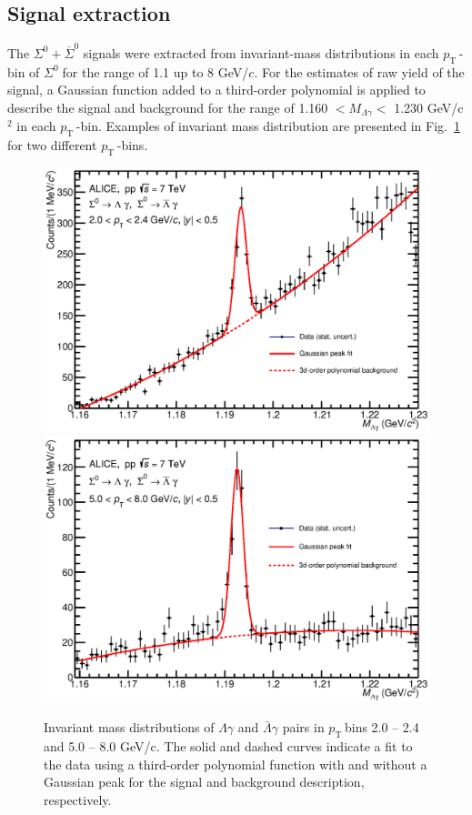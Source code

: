 \documentclass[ALICE,manyauthors]{cernphprep}
\newcommand{\sig}{\ensuremath{\Sigma^0  \; }}
\newcommand{\pt}{\ensuremath{p_{\mathrm{T}\; }}}
\begin{document}
 \subsection{Signal extraction} 
 \label{subsec:signal}

The $\Sigma^{0} + \overline{\Sigma}^{0}$ signals were extracted from invariant-mass 
distributions in each \pt-bin of \sig for the range of 1.1 up to 8 GeV/$c$. For the estimates of raw yield of
the signal, a Gaussian function added to a third-order polynomial is applied to describe the signal and 
background for the range of 1.160 $< M_{\Lambda\gamma}<$ 1.230 GeV/c$^2$ in each \pt-bin. Examples of 
invariant mass distribution are presented in Fig.~\ref{fig:InvMassSigma0} for two different \pt-bins.

\begin{figure}[h!]
\hspace*{-1.0cm}  \includegraphics[width=9.cm]{Figure/10jan18Minvbin3.eps}
\hspace*{-1.0cm}  \includegraphics[width=9.cm]{Figure/10jan18Minvbin8.eps}
\caption{
Invariant mass distributions of $\Lambda\gamma$ and $\bar \Lambda \gamma$ pairs in \pt bins 2.0 -- 2.4 
and 5.0 -- 8.0 GeV/c. The solid and dashed curves indicate a fit to the data using a third-order polynomial 
function with and without a Gaussian peak for the signal and background description, respectively.
}
  \label{fig:InvMassSigma0}
\end{figure}
\end{document}
